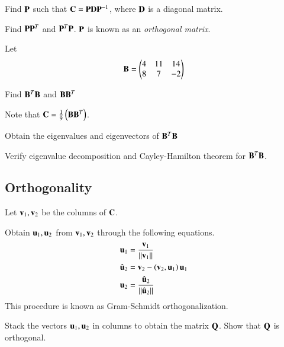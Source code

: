 \begin{problem}
Find $\mathbf{P}$ such that  $\mathbf{C} = \mathbf{P}\mathbf{D}\mathbf{P}^{-1}$, where $\mathbf{D}$ is a diagonal matrix.  
\end{problem}

\begin{problem}
	Find $\mathbf{P}\mathbf{P}^T$ and $\mathbf{P}^T\mathbf{P}$.  $\mathbf{P}$ is known as an {\em orthogonal matrix}.
\end{problem}
Let
\begin{equation}
\mathbf{B} =
\begin{pmatrix}
4 & 11 & 14
\\
8 & 7 & -2
\end{pmatrix}
\end{equation}
%
\begin{problem}
Find $\mathbf{B}^T\mathbf{B}$ and $\mathbf{B}\mathbf{B}^T$
\end{problem}

Note that $\mathbf{C} = \frac{1}{9}\left(\mathbf{B}\mathbf{B}^T\right)$.  

\begin{problem}
	Obtain the eigenvalues and eigenvectors of $\mathbf{B}^T\mathbf{B}$
\end{problem}
%
\begin{problem}
	Verify eigenvalue decomposition and Cayley-Hamilton theorem for $\mathbf{B}^T\mathbf{B}$.
\end{problem}

\subsection{Orthogonality}
Let $\mathbf{v}_1,\mathbf{v}_2$ be the columns of $\mathbf{C}$.

\begin{problem}
	Obtain $\mathbf{u}_1,\mathbf{u}_2$ from $\mathbf{v}_1,\mathbf{v}_2$ through the following equations. 
\begin{align}
\mathbf{u}_1&= \frac{\mathbf{v}_1}{\lVert\mathbf{v}_1\rVert}
\\
\hat{\mathbf{u}}_2 &= \mathbf{v}_2 - \left(\mathbf{v}_2,\mathbf{u}_1\right)\mathbf{u}_1
\\
\mathbf{u}_2 &= \frac{\hat{\mathbf{u}}_2}{\lVert\hat{\mathbf{u}}_2\rVert}
\end{align}
	This procedure is known as Gram-Schmidt orthogonalization.
\end{problem}

\begin{problem}
Stack the vectors $\mathbf{u}_1,\mathbf{u}_2$ in columns to obtain the matrix $\mathbf{Q}$.  Show that $\mathbf{Q}$ is orthogonal.  
\end{problem}

